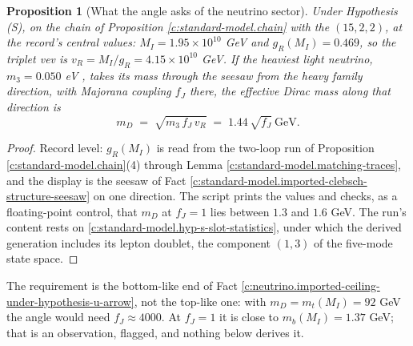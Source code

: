 \documentclass[11pt]{article}
\newtheorem{proposition}[theorem]{Proposition}
\theoremstyle{definition}
\theoremstyle{plain}
\newcommand{\changedmark}[2]{\marginpar{\raggedright\scriptsize\color{#1}#2}}
\begin{document}
\begin{proposition}[What the angle asks of the neutrino sector]\label{c:standard-model.what-angle-asks-neutrino-sector}
\changedmark{gray}{reworded}
Under Hypothesis (S), on the chain of Proposition \ref{c:standard-model.chain} with the $(15,2,2)$, at the record's central values: $M_{I} = 1.95 \times 10^{10}$ GeV and $g_{R}(M_{I}) = 0.469$, so the triplet vev is $v_{R} = M_{I}/g_{R} = 4.15 \times 10^{10}$ GeV. If the heaviest light neutrino, $m_{3} = 0.050$ eV \cite{PDG2024}, takes its mass through the seesaw from the heavy family direction, with Majorana coupling $f_{J}$ there, the effective Dirac mass along that direction is
\[
m_{D} \;=\; \sqrt{m_{3}\,f_{J}\,v_{R}} \;=\; 1.44\,\sqrt{f_{J}}\ \text{GeV}.
\]
\end{proposition}
\begin{proof}
Record level: $g_{R}(M_{I})$ is read from the two-loop run of Proposition \ref{c:standard-model.chain}(4) through Lemma \ref{c:standard-model.matching-traces}, and the display is the seesaw of Fact \ref{c:standard-model.imported-clebsch-structure-seesaw} on one direction. The script prints the values and checks, as a floating-point control, that $m_{D}$ at $f_{J} = 1$ lies between $1.3$ and $1.6$ GeV. The run's content rests on \ref{c:standard-model.hyp-s-slot-statistics}, under which the derived generation includes its lepton doublet, the component $(1,3)$ of the five-mode state space.

\end{proof}

\label{c:note.standard-model.setting-weak-angle-pati-salam-route-2}
The requirement is the bottom-like end of Fact \ref{c:neutrino.imported-ceiling-under-hypothesis-u-arrow}, not the top-like one: with $m_{D} = m_{t}(M_{I}) = 92$ GeV the angle would need $f_{J} \approx 4000$. At $f_{J} = 1$ it is close to $m_{b}(M_{I}) = 1.37$ GeV; that is an observation, flagged, and nothing below derives it.
\end{document}
